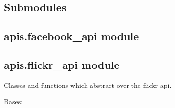 \documentclass[letterpaper,10pt,english]{sphinxmanual}
\begin{document}
\subsection{Submodules}
\label{apis:submodules}

\subsection{apis.facebook\_api module}
\label{apis:apis-facebook-api-module}\label{apis:module-apis.facebook_api}

\subsection{apis.flickr\_api module}
\label{apis:module-apis.flickr_api}\label{apis:apis-flickr-api-module}
Classes and functions which abstract over the flickr api.

\begin{fulllineitems}
\label{apis:apis.flickr_api.FlickrQuery}
Bases: {\hyperref[apis:apis.Query]{\emph{}}}

\end{fulllineitems}


\begin{fulllineitems}
\label{apis:apis.flickr_api.PhotoCollection}~

\begin{fulllineitems}
\label{apis:apis.flickr_api.PhotoCollection.count_photos}
\end{fulllineitems}


\begin{fulllineitems}
\label{apis:apis.flickr_api.PhotoCollection.get_random_link}
\end{fulllineitems}


\begin{fulllineitems}
\label{apis:apis.flickr_api.PhotoCollection.to_points}
\end{fulllineitems}


\end{fulllineitems}
\end{document}
